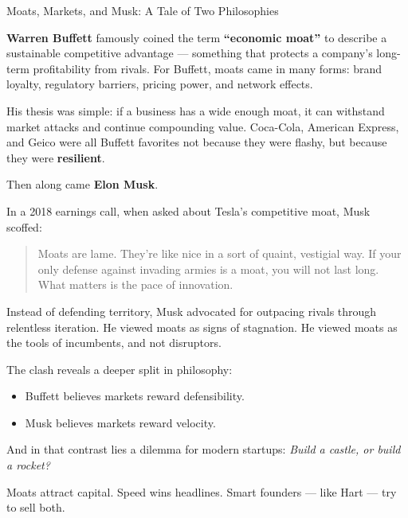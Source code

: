 \begin{HistoricalSidebar}{Moats, Markets, and Musk: A Tale of Two Philosophies}

  \textbf{Warren Buffett} famously coined the term \textbf{“economic moat”} to describe a sustainable competitive advantage — 
  something that protects a company’s long-term profitability from rivals. For Buffett, moats came in many forms: 
  brand loyalty, regulatory barriers, pricing power, and network effects.  
  
  \medskip
  
  His thesis was simple: if a business has a wide enough moat, it can withstand market attacks and continue compounding value. 
  Coca-Cola, American Express, and Geico were all Buffett favorites not because they were flashy, but because they were 
  \textbf{resilient}.  
  
  \medskip
  
  Then along came \textbf{Elon Musk}.  
  
  \medskip
  
  In a 2018 earnings call, when asked about Tesla’s competitive moat, Musk scoffed:
  
  \begin{quote}
  Moats are lame. They’re like nice in a sort of quaint, vestigial way. If your only defense against invading armies 
  is a moat, you will not last long. What matters is the pace of innovation.
  \end{quote}
  
  \medskip
  
  Instead of defending territory, Musk advocated for outpacing rivals through relentless iteration.  
  He viewed moats as signs of stagnation. He viewed moats as the tools of incumbents, and not disruptors.
  
  \medskip
  
  The clash reveals a deeper split in philosophy:  

  \medskip
  
  \begin{itemize}
    \item Buffett believes markets reward defensibility.
    \item Musk believes markets reward velocity.
  \end{itemize}
  
  \medskip
  
  And in that contrast lies a dilemma for modern startups:  
  \textit{Build a castle, or build a rocket?}  

  \medskip
  
  Moats attract capital. Speed wins headlines.  
  Smart founders — like Hart — try to sell both.
  
\end{HistoricalSidebar}

